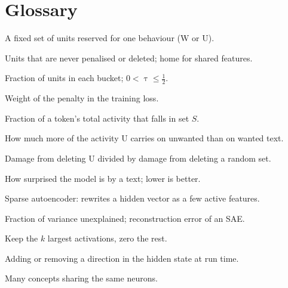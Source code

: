 \documentclass[11pt,a4paper]{article}
\theoremstyle{definition}
\newcommand{\Wb}{\mathrm{W}}
\newcommand{\Nb}{\mathrm{N}}
\newcommand{\Ub}{\mathrm{U}}
\begin{document}
\section{Glossary}
\begin{description}[leftmargin=0pt,itemsep=1pt]
  \item[Bucket] A fixed set of units reserved for one behaviour ($\Wb$ or $\Ub$).
  \item[Neutral buffer ($\Nb$)] Units that are never penalised or deleted; home for shared features.
  \item[$\uptau$] Fraction of units in each bucket; $0<\uptau\le\frac12$.
  \item[$\uplambda$] Weight of the penalty in the training loss.
  \item[Share $s_S$] Fraction of a token's total activity that falls in set $S$.
  \item[Routing $R$] How much more of the activity $\Ub$ carries on unwanted than on wanted text.
  \item[Specificity $S$] Damage from deleting $\Ub$ divided by damage from deleting a random set.
  \item[Perplexity] How surprised the model is by a text; lower is better.
  \item[SAE] Sparse autoencoder: rewrites a hidden vector as a few active features.
  \item[FVU] Fraction of variance unexplained; reconstruction error of an SAE.
  \item[TopK] Keep the $k$ largest activations, zero the rest.
  \item[Steering] Adding or removing a direction in the hidden state at run time.
  \item[Superposition] Many concepts sharing the same neurons.
\end{description}



\end{document}
